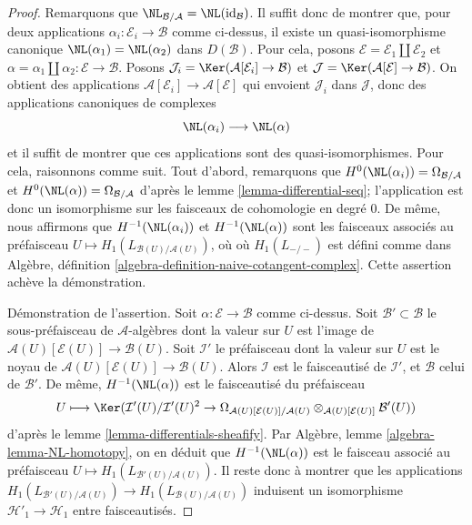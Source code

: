 \begin{proof}
Remarquons que
$\NL_{\mathcal{B}/\mathcal{A}} = \NL(\text{id}_\mathcal{B})$.
Il suffit donc de montrer que, pour deux applications
$\alpha_i : \mathcal{E}_i \to \mathcal{B}$ comme ci-dessus, il existe un
quasi-isomorphisme canonique $\NL(\alpha_1) = \NL(\alpha_2)$ dans
$D(\mathcal{B})$. Pour cela, posons
$\mathcal{E} = \mathcal{E}_1 \amalg \mathcal{E}_2$ et
$\alpha = \alpha_1 \amalg \alpha_2 : \mathcal{E} \to \mathcal{B}$.
Posons
$\mathcal{J}_i = \Ker(\mathcal{A}[\mathcal{E}_i] \to \mathcal{B})$
et
$\mathcal{J} = \Ker(\mathcal{A}[\mathcal{E}] \to \mathcal{B})$.
On obtient des applications
$\mathcal{A}[\mathcal{E}_i] \to \mathcal{A}[\mathcal{E}]$ qui envoient
$\mathcal{J}_i$ dans $\mathcal{J}$, donc des applications canoniques de complexes
$$
\NL(\alpha_i) \longrightarrow \NL(\alpha)
$$
et il suffit de montrer que ces applications sont des quasi-isomorphismes.
Pour cela, raisonnons comme suit. Tout d'abord, remarquons que
$H^0(\NL(\alpha_i)) = \Omega_{\mathcal{B}/\mathcal{A}}$ et
$H^0(\NL(\alpha)) = \Omega_{\mathcal{B}/\mathcal{A}}$ d'après
le lemme \ref{lemma-differential-seq}; l'application est donc un isomorphisme
sur les faisceaux de cohomologie en degré $0$.
De même, nous affirmons que $H^{-1}(\NL(\alpha_i))$ et
$H^{-1}(\NL(\alpha))$ sont les faisceaux associés au préfaisceau
$U \mapsto H_1(L_{\mathcal{B}(U)/\mathcal{A}(U)})$, où
où $H_1(L_{-/-})$ est défini comme dans
Algèbre, définition \ref{algebra-definition-naive-cotangent-complex}.
Cette assertion achève la démonstration.

\medskip\noindent
Démonstration de l'assertion. Soit
$\alpha : \mathcal{E} \to \mathcal{B}$ comme ci-dessus. Soit
$\mathcal{B}' \subset \mathcal{B}$ le sous-préfaisceau de
$\mathcal{A}$-algèbres dont la valeur sur $U$ est l'image de
$\mathcal{A}(U)[\mathcal{E}(U)] \to \mathcal{B}(U)$. Soit $\mathcal{I}'$
le préfaisceau dont la valeur sur $U$ est le noyau de
$\mathcal{A}(U)[\mathcal{E}(U)] \to \mathcal{B}(U)$. Alors $\mathcal{I}$
est le faisceautisé de $\mathcal{I}'$, et $\mathcal{B}$ celui de
$\mathcal{B}'$. De même, $H^{-1}(\NL(\alpha))$ est le faisceautisé du préfaisceau
$$
U \longmapsto
\Ker(\mathcal{I}'(U)/\mathcal{I}'(U)^2 \to
\Omega_{\mathcal{A}(U)[\mathcal{E}(U)]/\mathcal{A}(U)}
\otimes_{\mathcal{A}(U)[\mathcal{E}(U)]} \mathcal{B}'(U))
$$
d'après le lemme \ref{lemma-differentials-sheafify}.
Par Algèbre, lemme \ref{algebra-lemma-NL-homotopy}, on en déduit que
$H^{-1}(\NL(\alpha))$ est le faisceau associé au préfaisceau
$U \mapsto H_1(L_{\mathcal{B}'(U)/\mathcal{A}(U)})$. Il reste donc à montrer
que les applications
$H_1(L_{\mathcal{B}'(U)/\mathcal{A}(U)}) \to
H_1(L_{\mathcal{B}(U)/\mathcal{A}(U)})$ induisent un isomorphisme
$\mathcal{H}'_1 \to \mathcal{H}_1$ entre faisceautisés.


\end{proof}
